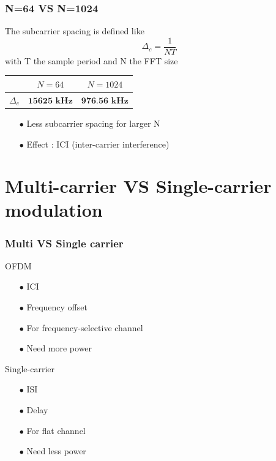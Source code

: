 \documentclass[11pt]{beamer}
\begin{document}
\begin{frame}
\frametitle{N=64 VS N=1024}
The subcarrier spacing is defined like
\begin{equation}
\Delta_c=\frac{1}{NT} 
\end{equation}
with T the sample period and N the FFT size

\begin{center}
	\begin{tabular}{c|c|c}
		  & $N=64$ & $N=1024$\\
		  \hline
	$\Delta_c$ & $\textbf{15625~kHz}$ & $\textbf{976.56 kHz}$ \\
	\end{tabular}
	\label{tab3}
\end{center}

\begin{itemize}

\item[$\bullet$] Less subcarrier spacing for larger N
\item[$\bullet$] Effect : ICI (inter-carrier interference)
\end{itemize}


\end{frame}



\section{Multi-carrier VS Single-carrier modulation}

\begin{frame}
\frametitle{Multi VS Single carrier}
\begin{minipage}[t]{0.48\linewidth}
OFDM
\begin{itemize}
\item[$\bullet$] {\color{red} ICI}
\item[$\bullet$] {\color{red} Frequency offset}
\item[$\bullet$] For frequency-selective channel
\item[$\bullet$] Need more power

\end{itemize}
\end{minipage}\hfill
\begin{minipage}[t]{0.48\linewidth}
Single-carrier
\begin{itemize}
\item[$\bullet$] {\color{red} ISI}
\item[$\bullet$] {\color{red} Delay} 
\item[$\bullet$] For flat channel
\item[$\bullet$] Need less power 

\end{itemize}

\end{minipage}





\end{frame}
\end{document}

